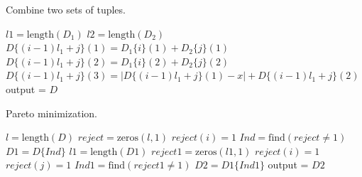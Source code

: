\begin{algorithm}
\caption{Combine two sets of tuples.} \label{algocph1}
\begin{algorithmic}[1]
\State $l1 = \text{length}(D_1)$
\State $l2 = \text{length}(D_2)$
		    \State $D\{(i-1)l_1+j\}(1) = D_1\{i\}(1) + D_2\{j\}(1)$
		    \State $D\{(i-1)l_1+j\}(2) = D_1\{i\}(2) + D_2\{j\}(2)$
		    \State $D\{(i-1)l_1+j\}(3) = |D\{(i-1)l_1+j\}(1)-x|+D\{(i-1)l_1+j\}(2)$
		 \EndFor
\EndFor
\State output = $D$
\EndFunction
\end{algorithmic}
\end{algorithm}

\begin{algorithm}
\caption{Pareto minimization.} \label{algocph2}
\begin{algorithmic}[1]
\State $l = \text{length}(D)$
\State $reject = \text{zeros}(l,1)$
	    \State $reject(i) = 1$
	\EndIf
\EndFor
\State $Ind = \text{find}(reject\neq 1)$
\State $D1 = D\{Ind\}$
\State $l1 = \text{length}(D1)$
\State $reject1 = \text{zeros}(l1,1)$
            \State $reject(i)=1$
            \State $reject(j)=1$
        \EndIf
    \EndFor
\EndFor
\State $Ind1 = \text{find}(reject1\neq 1)$
\State $D2 = D1\{Ind1\}$
\State output = $D2$
\EndFunction
\end{algorithmic}
\end{algorithm}


